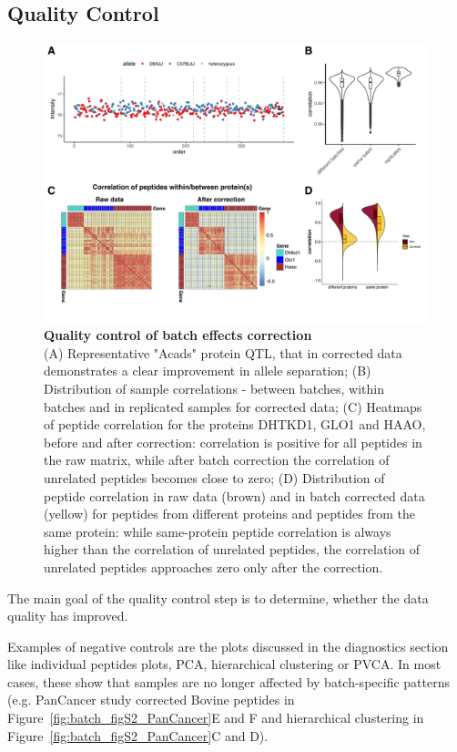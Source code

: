\documentclass[num-refs]{wiley-article}
\begin{document}
\subsection{Quality Control}
\begin{figure}[hbt]
	\includegraphics[width=\textwidth]{figures/Fig5_quality_control2.pdf}
	
	\caption{\textbf{Quality control of batch effects correction}  \\
		\footnotesize
		(A) Representative "Acads" protein QTL, that in corrected data demonstrates a clear improvement in allele separation; (B) Distribution of sample correlations - between batches, within batches and in replicated samples for corrected data; (C)  Heatmaps of peptide correlation for the proteins DHTKD1, GLO1 and HAAO, before and after correction: correlation is positive for all peptides in the raw matrix, while after batch correction the correlation of unrelated peptides becomes close to zero; (D) Distribution of peptide correlation in raw data (brown) and in batch corrected data (yellow) for peptides from different proteins and peptides from the same protein: while same-protein peptide correlation is always higher than the correlation of unrelated peptides, the correlation of unrelated peptides approaches zero only after the correction.}
	\label{fig:batch_fig6_QualityControl}
\end{figure}


The main goal of the quality control step is to determine, whether the data quality has improved. 

Examples of negative controls are the plots discussed in the diagnostics section like individual peptides plots, PCA, hierarchical clustering or PVCA. In most cases, these show that samples are no longer affected by batch-specific patterns (e.g. PanCancer study corrected Bovine peptides in Figure~\ref{fig:batch_figS2_PanCancer}E and F and hierarchical clustering in Figure~\ref{fig:batch_figS2_PanCancer}C and D).
\end{document}

